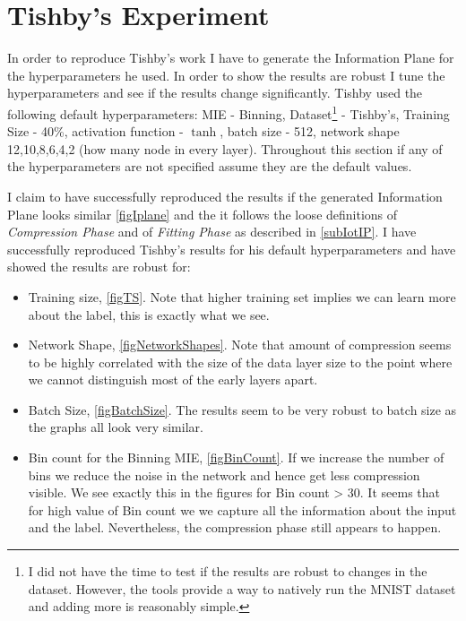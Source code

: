 \documentclass[dissertation.tex]{subfiles}
\begin{document}
\section{Tishby's Experiment}

In order to reproduce Tishby's work I have to generate the Information Plane for
the hyperparameters he used. In order to show the results are robust I tune the
hyperparameters and see if the results change significantly. Tishby used the
following default hyperparameters: MIE - Binning, Dataset\footnote{I did not
have the time to test if the results are robust to changes in the dataset.
However, the tools provide a way to natively run the MNIST dataset and adding
more is reasonably simple.} - Tishby's, Training Size - 40\%, activation
function - $\tanh$, batch size - 512, network shape 12,10,8,6,4,2 (how many node
in every layer). Throughout this section if any of the hyperparameters are not
specified assume they are the default values. 

I claim to have successfully reproduced the results if the generated Information
Plane looks similar \autoref{figIplane} and the it follows the loose definitions
of \emph{Compression Phase} and of \emph{Fitting Phase} as described in
\autoref{subIotIP}. I have successfully reproduced Tishby's results for his
default hyperparameters and have showed the results are robust for:
\begin{itemize}
  \item{
      Training size, \autoref{figTS}. Note that higher training set implies we
      can learn more about the label, this is exactly what we see.
    }
  \item{
      Network Shape, \autoref{figNetworkShapes}. Note that amount of compression
      seems to be highly correlated with the size of the data layer size to the
      point where we cannot distinguish most of the early layers apart.
    }
  \item{
      Batch Size, \autoref{figBatchSize}. The results seem to be very robust to
      batch size as the graphs all look very similar. 
    }
  \item{
      Bin count for the Binning MIE, \autoref{figBinCount}. If we increase the
      number of bins we reduce the noise in the network and hence get less
      compression visible. We see exactly this in the figures for Bin count >
      30. It seems that for high value of Bin count we we capture all the
      information about the input and the label. Nevertheless, the compression
      phase still appears to happen.
    }
\end{itemize}
\end{document}
